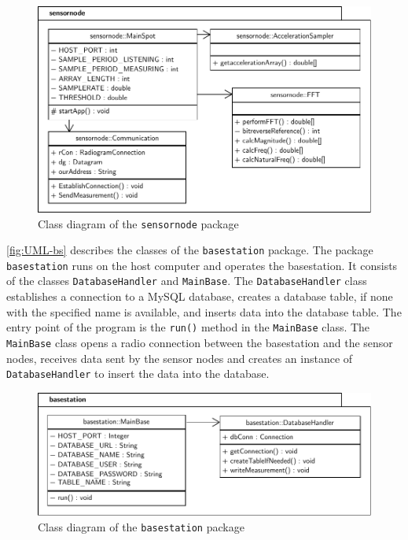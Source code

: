 \documentclass[12pt,a4paper]{scrartcl}
\begin{document}
\begin{figure}[ht]
    \centering
    \includegraphics[width = \textwidth]{figures/uml-sensornode.pdf}
    \caption{Class diagram of the \texttt{sensornode} package}
    \label{fig:UML-sn}
\end{figure}

\autoref{fig:UML-bs} describes the classes of the \texttt{base\-station} package.
The package \texttt{base\-station} runs on the host computer and operates the basestation.
It consists of the classes \texttt{Database\-Handler} and \texttt{Main\-Base}.
The \texttt{Database\-Handler} class establishes a connection to a MySQL database, creates a database table, if none with the specified name is available, and inserts data into the database table.
The entry point of the program is the \texttt{run()} method in the \texttt{Main\-Base} class. The \texttt{Main\-Base} class opens a radio connection between the basestation and the sensor nodes, receives data sent by the sensor nodes and creates an instance of \texttt{Database\-Handler} to insert the data into the database.

\begin{figure}[h!]
    \centering
    \includegraphics[width = \textwidth]{figures/uml-basestation.pdf}
    \caption{Class diagram of the \texttt{basestation} package}
    \label{fig:UML-bs}
\end{figure}
\end{document}
